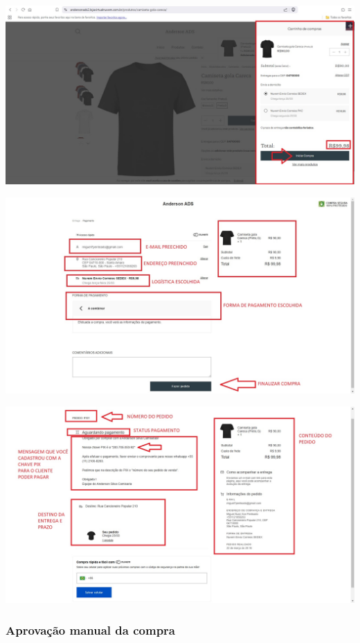 \documentclass[
]{book}
\begin{document}
\includegraphics{images/np1/100-loja_virtual_iniciando_compra4.jpg}

\includegraphics{images/np1/101-loja_virtual_iniciando_compra5.jpg}

\includegraphics{images/np1/102-loja_virtual_iniciando_compra6.jpg}

\subsubsection{Aprovação manual da compra}\label{aprovauxe7uxe3o-manual-da-compra}
\end{document}
